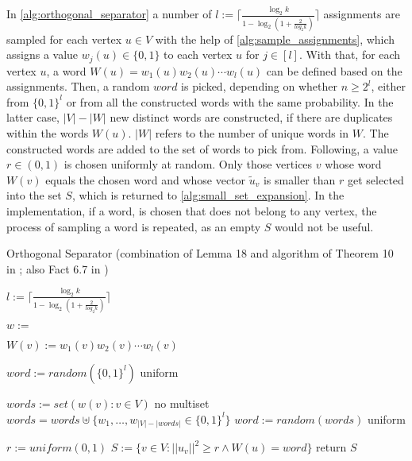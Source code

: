 In \cref{alg:orthogonal_separator} a number of $l := \lceil \frac{\log_2 k}{1-\log_2 (1+\frac{2}{log_2 k})}\rceil$ assignments are sampled for each vertex $u \in V$ with the help of \cref{alg:sample_assignments}, which assigns a value $w_j(u) \in \{0,1\}$ to each vertex $u$ for $j \in [l]$. With that, for each vertex $u$, a word $W(u) =  w_1(u)w_2(u)\cdots w_l(u)$ can be defined based on the assignments. Then, a random $word$ is picked, depending on whether $n\ge 2^l$, either from $\{0,1\}^l$ or from all the constructed words with the same probability. In the latter case, $|V|-|W| $ new distinct words are constructed, if there are duplicates within the words $W(u)$. $|W|$ refers to the number of unique words in $W$. The constructed words are added to the set of words to pick from. Following, a value $r\in(0,1)$ is chosen uniformly at random. Only those vertices $v$ whose word $W(v)$ equals the chosen word and whose vector $\tilde{u}_v$ is smaller than $r$ get selected into the set $S$, which is returned to \cref{alg:small_set_expansion}. In the implementation, if a word, is chosen that does not belong to any vertex, the process of sampling a word is repeated, as an empty $S$ would not be useful.

\begin{algorithm}[htpb]
\caption{Orthogonal Separator (combination of Lemma 18 and algorithm of Theorem 10 in \cite{LouisM14}; also Fact 6.7 in \cite{ChanLTZ16}) \label{alg:orthogonal_separator}} 

\begin{algorithmic}
	\State $l := \lceil \frac{\log_2 k}{1-\log_2 (1+\frac{2}{log_2 k})}\rceil$


	
	\State $w := $
	
	\State $W(v) := w_1(v)w_2(v)\cdots w_l(v)$
	\EndFor
	
	\State $word := random( \{0,1\}^l)$ \Comment uniform
	
	\Else
	 
	\State $words := set({w(v): v\in V})$ \Comment no multiset
	\State $words = words \uplus \{w_1, \ldots , w_{|V|-|words|} \in \{0,1\}^l\} $ 
	\State $word := random(words)$ \Comment uniform
	
	\EndIf
	
	\State $r := uniform(0,1)$
	\State $S := \{v \in V: ||u_v||^2 \ge r \land W(u) = word \}$
	\State return $S$
	
	\EndFunction %
\end{algorithmic}
\end{algorithm}	

